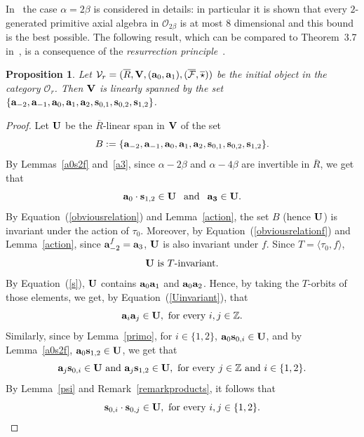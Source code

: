 \documentclass[a4paper]{amsart}
\newtheorem{proposition}[lemma]{Proposition}
\newcommand{\Ro}{{\overline R}}
\newcommand{\Vo}{{\bf V}}
\newcommand{\Z}{{\mathbb Z}}
\newcommand{\al}{\alpha}
\newcommand{\bt}{\beta}
\newcommand{\ba}{{\bf a}}
\newcommand{\bs}{{\bf s}}
\begin{document}
In~\cite{FMS2} the case $\al=2\bt$ is considered in details: in particular it is shown that every $2$-generated primitive axial algebra  in  $\mathcal O_{2\bt}$ is at most $8$ dimensional and this bound is the best possible.
The following result, which can be compared to Theorem~3.7 in~\cite{R}, is a  consequence of the {\it resurrection principle}~\cite[Lemma~1.7]{IPSS10}. 
\begin{proposition}\label{span}
Let $\mathcal V_r=(\Ro,\Vo, (\ba_0, \ba_1), (\overline{\mathcal F}, \overline \star))$  be the initial object in the category $\mathcal O_r$. Then
$\Vo$ is linearly spanned by the set $\{ \ba_{-2}, \ba_{-1}, \ba_0, \ba_1, \ba_2, \bs_{0,1}, \bs_{0,2}, \bs_{1,2}\}
$.
\end{proposition}
\begin{proof}
Let $\bf U$ be the  $\Ro$-linear span in $\Vo$ of the set  
$$B:=\{ \ba_{-2}, \ba_{-1}, \ba_0, \ba_1, \ba_2, \bs_{0,1}, \bs_{0,2}, \bs_{1,2}\}.$$
By Lemmas~\ref{a0s2f} and~\ref{a3}, since $\al-2\bt$ and $\al-4\bt$ are invertible in $\Ro$, we get that
$$\ba_0\cdot \bs_{1,2}\in \bf U\:\: \mbox{ and }\:\:  \ba_3\in \bf U.$$
By Equation~(\ref{obviousrelation}) and Lemma~\ref{action}, the set $B$ (hence $\bf U$) is invariant under the action of $\tau_0$. Moreover,  by Equation~(\ref{obviousrelationf}) and Lemma~\ref{action},  since $\ba_{-2}^f=\ba_3$, $\bf U$ is also invariant under $f$. Since $T=\langle \tau_0, f\rangle$, 
\begin{equation}\label{Uinvariant}
{\bf U} \mbox{ is } T\mbox{-invariant}.
\end{equation}
By Equation~(\ref{s}), $\bf U$ contains $\ba_0\ba_1$ and  $\ba_0\ba_2$. Hence, by taking the $T$-orbits of those elements, we get, by Equation~(\ref{Uinvariant}), that 
\begin{equation}
 \ba_i \ba_j\in {\bf U}, \mbox{ for every } i,j\in \Z.
\end{equation}
Similarly, since by Lemma~\ref{primo}, for $i\in \{1,2\}$, $\ba_0\bs_{0,i}\in \bf U$, and  by Lemma~\ref{a0s2f}, $\ba_0 \bs_{1,2}\in \bf U$, we get that 
\begin{equation}
\ba_j \bs_{0,i} \in {\bf U}\mbox{ and } \ba_j \bs_{1,2} \in {\bf U},  \mbox{ for every } j\in \Z \mbox{ and } i\in \{1,2\}.
\end{equation}
%
By Lemma~\ref{psi} and Remark~\ref{remarkproducts}, it follows that 
\begin{equation}\label{}
\bs_{0,i}\cdot \bs_{0,j}\in {\bf U}, \mbox{ for every }i,j\in \{1,2\}. 

\end{equation}
\end{proof}
\end{document}
